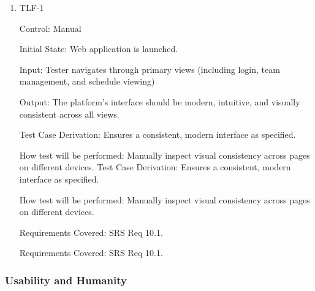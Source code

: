 \documentclass[12pt, titlepage]{article}
\begin{document}
\begin{enumerate}

  \item{TLF-1\\}

        Control: Manual

        Initial State: Web application is launched.

        Input: Tester navigates through primary views (including login, team management, and schedule viewing)

        Output: The platform’s interface should be modern, intuitive, and visually consistent across all views.

        Test Case Derivation: Ensures a consistent, modern interface as specified.

        How test will be performed: Manually inspect visual consistency across pages on different devices.
Test Case Derivation: Ensures a consistent, modern interface as specified.
					
How test will be performed: Manually inspect visual consistency across pages on different devices.

Requirements Covered: SRS Req 10.1.

        Requirements Covered: SRS Req 10.1.

\end{enumerate}

\subsubsection{Usability and Humanity}
\end{document}
